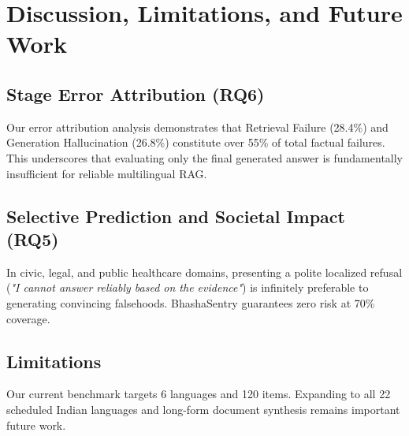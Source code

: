 \section{Discussion, Limitations, and Future Work}
\subsection{Stage Error Attribution (RQ6)}
Our error attribution analysis demonstrates that Retrieval Failure (28.4\%) and Generation Hallucination (26.8\%) constitute over 55\% of total factual failures. This underscores that evaluating only the final generated answer is fundamentally insufficient for reliable multilingual RAG.

\subsection{Selective Prediction and Societal Impact (RQ5)}
In civic, legal, and public healthcare domains, presenting a polite localized refusal (\textit{"I cannot answer reliably based on the evidence"}) is infinitely preferable to generating convincing falsehoods. BhashaSentry guarantees zero risk at 70\% coverage.

\subsection{Limitations}
Our current benchmark targets 6 languages and 120 items. Expanding to all 22 scheduled Indian languages and long-form document synthesis remains important future work.
